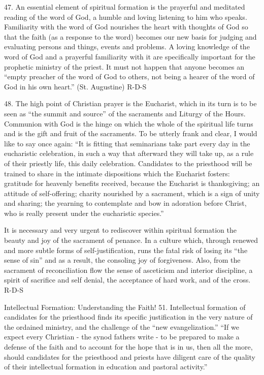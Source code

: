 \documentclass[oneside]{book}
\begin{document}
47. An essential element of spiritual formation is the prayerful and meditated
reading of the word of God, a humble and loving listening to him who
speaks. Familiarity with the word of God nourishes the heart with thoughts of
God so that the faith (as a response to the word) becomes our new basis for
judging and evaluating persons and things, events and problems. A loving
knowledge of the word of God and a prayerful familiarity with it are
specifically important for the prophetic ministry of the priest. It must not
happen that anyone becomes an ``empty preacher of the word of God to others, not
being a hearer of the word of God in his own heart.'' (St. Augustine)
R-D-S

48. The high point of Christian prayer is the Eucharist, which in its turn is to
be seen as ``the summit and source'' of the sacraments and Liturgy of the
Hours. Communion with God is the hinge on which the whole of the spiritual life
turns and is the gift and fruit of the sacraments.
To be utterly frank and clear, I would like to say once again: ``It is fitting
that seminarians take part every day in the eucharistic celebration, in such a
way that afterward they will take up, as a rule of their priestly life, this
daily celebration. Candidates to the priesthood will be trained to share in the
intimate dispositions which the Eucharist fosters: gratitude for heavenly
benefits received, because the Eucharist is thanksgiving; an attitude of
self-offering; charity nourished by a sacrament, which is a sign of unity and
sharing; the yearning to contemplate and bow in adoration before Christ, who is
really present under the eucharistic species.''

It is necessary and very urgent to rediscover within spiritual formation the
beauty and joy of the sacrament of penance. In a culture which, through renewed
and more subtle forms of self-justification, runs the fatal risk of losing its
``the sense of sin'' and as a result, the consoling joy of forgiveness. Also,
from the sacrament of reconciliation flow the sense of asceticism and interior
discipline, a spirit of sacrifice and self denial, the acceptance of hard work,
and of the cross.
R-D-S

Intellectual Formation: Understanding the Faith!
51. Intellectual formation of candidates for the priesthood finds its specific
justification in the very nature of the ordained ministry, and the challenge of
the ``new evangelization.'' ``If we expect every Christian - the synod fathers
write - to be prepared to make a defense of the faith and to account for the
hope that is in us, then all the more, should candidates for the priesthood and
priests have diligent care of the quality of their intellectual formation in
education and pastoral activity.''
\end{document}
